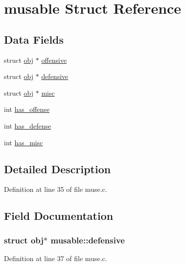 \hypertarget{structmusable}{\section{musable Struct Reference}
\label{structmusable}
}
\subsection*{Data Fields}
\begin{DoxyCompactItemize}
\item 
struct \hyperlink{structobj}{obj} $\ast$ \hyperlink{structmusable_a016d6af9ae60f010812a200105259397}{offensive}
\item 
struct \hyperlink{structobj}{obj} $\ast$ \hyperlink{structmusable_ab3fe45fea3739167d9ba53746e0838ab}{defensive}
\item 
struct \hyperlink{structobj}{obj} $\ast$ \hyperlink{structmusable_a7588e8e6ab60f4ea8fe12d61b674f52b}{misc}
\item 
int \hyperlink{structmusable_af4b04fd9bf567b138538681c91d145e9}{has\+\_\+offense}
\item 
int \hyperlink{structmusable_a70288ed35c7e3f6a1f0905c39a16c2d3}{has\+\_\+defense}
\item 
int \hyperlink{structmusable_aa2d416f925ea6cbead5267d5462e4aef}{has\+\_\+misc}
\end{DoxyCompactItemize}


\subsection{Detailed Description}


Definition at line 35 of file muse.\+c.



\subsection{Field Documentation}
\hypertarget{structmusable_ab3fe45fea3739167d9ba53746e0838ab}{
\subsubsection[{defensive}]{\setlength{\rightskip}{0pt plus 5cm}struct {\bf obj}$\ast$ musable\+::defensive}}\label{structmusable_ab3fe45fea3739167d9ba53746e0838ab}


Definition at line 37 of file muse.\+c.




